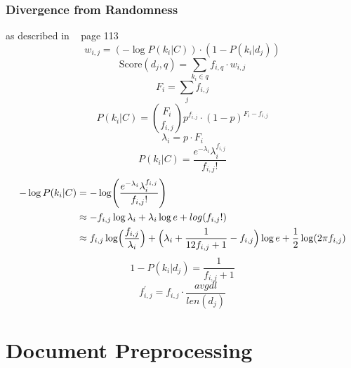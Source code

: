 \subsubsection{Divergence from Randomness}
\label{sec:divergence_from_randomness}

as described in ~\cite{ModernInvormationRetrieval1999} page 113
\begin{equation}
  w_{i, j} = (- \log P(k_i | C)) \cdot (1 - P(k_i | d_j))
\end{equation}
\begin{equation}
  \text{Score}(d_j, q) = \sum_{k_i \in q} f_{i, q} \cdot w_{i, j}
\end{equation}
\begin{equation}
  F_i = \sum_j f_{i, j}
\end{equation}
\begin{equation}
  P(k_i | C) = \binom{F_i}{f_{i, j}}p^{f_{i, j}} \cdot (1 - p)^{F_i - f_{i, j}}
\end{equation}
\begin{equation}
  \lambda_i = p \cdot F_i
\end{equation}
\begin{equation}
  P(k_i | C) = \frac{e^{-\lambda_i}\lambda_i^{f_{i, j}}}{f_{i, j}!}
\end{equation}
\begin{equation}
  \begin{split}
    - \log P(k_i | C) & = -\log\Biggl(\frac{e^{-\lambda_i}\lambda_i^{f_{i, j}}}{f_{i, j}!}\Biggr) \\
    & \approx -f_{i,j} \log \lambda_i + \lambda_i \log e + log(f_{i,j}!) \\
    & \approx f_{i, j} \log \Bigl( \frac{f_{i, j}}{\lambda_i} \Bigr) + \Bigl( \lambda_i + \frac{1}{12 f_{i, j} + 1} - f_{i, j}\Bigr) \log e + \frac{1}{2} \log(2 \pi f_{i, j})
  \end{split}
\end{equation}
\begin{equation}
  1 - P(k_i | d_j) = \frac{1}{f_{i, j} + 1}
\end{equation}
\begin{equation}
  f^{\prime}_{i, j} = f_{i, j} \cdot \frac{avgdl}{len(d_j)}
\end{equation}


\section{Document Preprocessing}
\label{sec:document_preprocessing}

